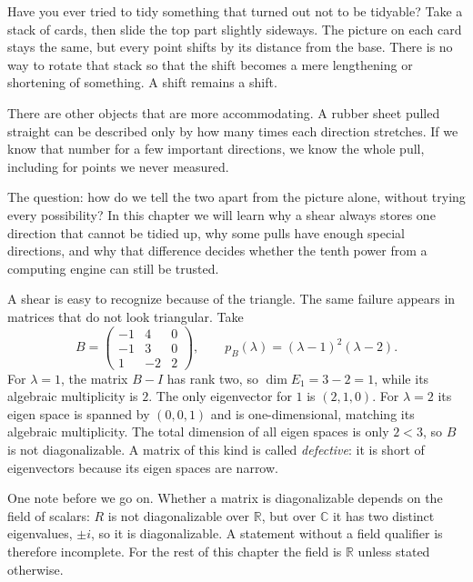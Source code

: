\begin{untukanak}
Have you ever tried to tidy something that turned out not to be tidyable? Take a stack of cards,
then slide the top part slightly sideways. The picture on each card stays the same, but every
point shifts by its distance from the base. There is no way to rotate that stack so that the shift
becomes a mere lengthening or shortening of something. A shift remains a shift.

There are other objects that are more accommodating. A rubber sheet pulled straight can be
described only by how many times each direction stretches. If we know that number for a few
important directions, we know the whole pull, including for points we never measured.

The question: how do we tell the two apart from the picture alone, without trying every
possibility? In this chapter we will learn why a shear always stores one direction that cannot be
tidied up, why some pulls have enough special directions, and why that difference decides whether
the tenth power from a computing engine can still be trusted.
\end{untukanak}

A shear is easy to recognize because of the triangle. The same failure appears in matrices that do
not look triangular. Take
\[
  B=\begin{pmatrix}-1&4&0\\ -1&3&0\\ 1&-2&2\end{pmatrix},\qquad
  p_{B}(\lambda)=(\lambda-1)^{2}(\lambda-2).
\]
For $\lambda=1$, the matrix $B-I$ has rank two, so $\dim E_{1}=3-2=1$, while its algebraic
multiplicity is $2$. The only eigenvector for $1$ is $(2,1,0)$. For $\lambda=2$ its eigen space is
spanned by $(0,0,1)$ and is one-dimensional, matching its algebraic multiplicity. The total
dimension of all eigen spaces is only $2<3$, so $B$ is not diagonalizable. A matrix of this kind is
called \emph{defective}: it is short of eigenvectors because its eigen spaces are narrow.


One note before we go on. Whether a matrix is diagonalizable depends on the field of scalars: $R$
is not diagonalizable over $\mathbb{R}$, but over $\mathbb{C}$ it has two distinct eigenvalues,
$\pm i$, so it is diagonalizable. A statement without a field qualifier is therefore incomplete.
For the rest of this chapter the field is $\mathbb{R}$ unless stated otherwise.

